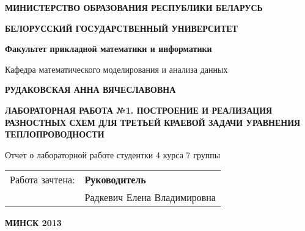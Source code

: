 ﻿\thispagestyle{empty}
\begin{normalsize}
\begin{center}
{\bf МИНИСТЕРСТВО ОБРАЗОВАНИЯ РЕСПУБЛИКИ БЕЛАРУСЬ}
\end{center}

\begin{center}
{\bf БЕЛОРУССКИЙ ГОСУДАРСТВЕННЫЙ УНИВЕРСИТЕТ}
\end{center}

\begin{center}
{\bf Факультет прикладной математики и информатики}
\end{center}

\begin{center}
Кафедра математического моделирования и анализа данных
\end{center}
\end{normalsize}
\bigskip
\bigskip
\bigskip
\bigskip
\bigskip
\bigskip

\begin{center}
{\bf РУДАКОВСКАЯ АННА ВЯЧЕСЛАВОВНА}
\end{center}
\bigskip

\begin{center}
{\bf ЛАБОРАТОРНАЯ РАБОТА №1. ПОСТРОЕНИЕ И РЕАЛИЗАЦИЯ РАЗНОСТНЫХ СХЕМ ДЛЯ ТРЕТЬЕЙ КРАЕВОЙ ЗАДАЧИ УРАВНЕНИЯ ТЕПЛОПРОВОДНОСТИ}
\end{center}
\bigskip
\bigskip
\bigskip
\bigskip

\begin{center}
Отчет о лабораторной работе\linebreak
студентки 4 курса 7 группы
\end{center}
\bigskip
\bigskip
\bigskip
\bigskip
\linespread{1.0}
\begin{tabular}{@{}p{9cm}@{}p{7cm}}
{\small Работа зачтена:} & {\bf\small Руководитель}\\
{\small{\bf }} & {\small Радкевич Елена Владимировна }\\
\end{tabular}


\begin{center}
\bf{МИНСК 2013}
\end{center}